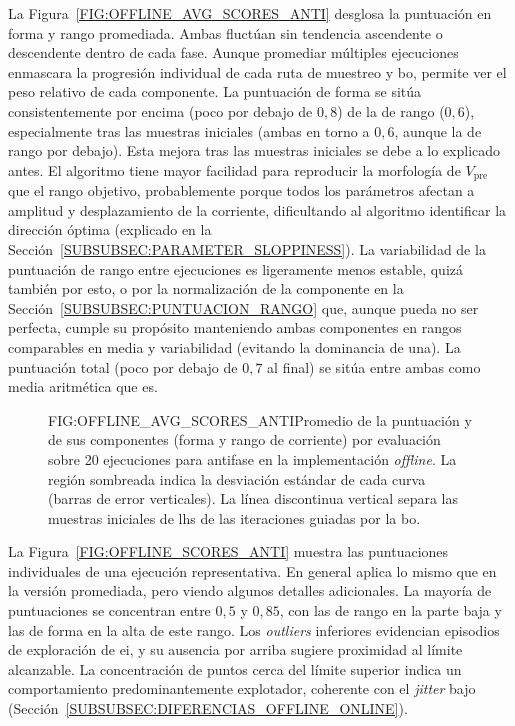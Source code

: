 La Figura~\ref{FIG:OFFLINE_AVG_SCORES_ANTI} desglosa la puntuación en forma y rango promediada. Ambas fluctúan sin tendencia ascendente o descendente dentro de cada fase. Aunque promediar múltiples ejecuciones enmascara la progresión individual de cada ruta de muestreo y \ac{bo}, permite ver el peso relativo de cada componente. La puntuación de forma se sitúa consistentemente por encima (poco por debajo de $0{,}8$) de la de rango ($0{,}6$), especialmente tras las muestras iniciales (ambas en torno a $0{,}6$, aunque la de rango por debajo). Esta mejora tras las muestras iniciales se debe a lo explicado antes. El algoritmo tiene mayor facilidad para reproducir la morfología de $V_{\mathrm{pre}}$ que el rango objetivo, probablemente porque todos los parámetros afectan a amplitud y desplazamiento de la corriente, dificultando al algoritmo identificar la dirección óptima (explicado en la Sección~\ref{SUBSUBSEC:PARAMETER_SLOPPINESS}). La variabilidad de la puntuación de rango entre ejecuciones es ligeramente menos estable, quizá también por esto, o por la normalización de la componente en la Sección~\ref{SUBSUBSEC:PUNTUACION_RANGO} que, aunque pueda no ser perfecta, cumple su propósito manteniendo ambas componentes en rangos comparables en media y variabilidad (evitando la dominancia de una). La puntuación total (poco por debajo de $0{,}7$ al final) se sitúa entre ambas como media aritmética que es.

\begin{figure}[Promedio de la puntuación y sus componentes por evaluación de la \acl{bo} \textit{offline} en antifase]{FIG:OFFLINE_AVG_SCORES_ANTI}{Promedio de la puntuación y de sus componentes (forma y rango de corriente) por evaluación sobre 20 ejecuciones para antifase en la implementación \textit{offline}. La región sombreada indica la desviación estándar de cada curva (barras de error verticales). La línea discontinua vertical separa las muestras iniciales de \ac{lhs} de las iteraciones guiadas por la \ac{bo}.}
\end{figure}

La Figura~\ref{FIG:OFFLINE_SCORES_ANTI} muestra las puntuaciones individuales de una ejecución representativa. En general aplica lo mismo que en la versión promediada, pero viendo algunos detalles adicionales. La mayoría de puntuaciones se concentran entre $0{,}5$ y $0{,}85$, con las de rango en la parte baja y las de forma en la alta de este rango. Los \textit{outliers} inferiores evidencian episodios de exploración de \ac{ei}, y su ausencia por arriba sugiere proximidad al límite alcanzable. La concentración de puntos cerca del límite superior indica un comportamiento predominantemente explotador, coherente con el \textit{jitter} bajo (Sección~\ref{SUBSUBSEC:DIFERENCIAS_OFFLINE_ONLINE}).

